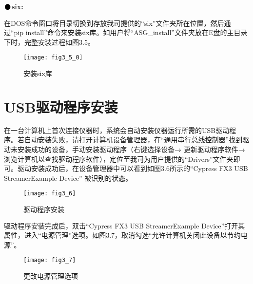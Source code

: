 \newpage
\noindent$\vcenter{\hbox{\huge$\bullet$}}$\quad\fontsize{12pt}{\baselineskip}\textbf{six:}

在DOS命令窗口将目录切换到存放我司提供的“six”文件夹所在位置，然后通过“pip install”命令来安装six库。如用户将“ASG\_install”文件夹放在E盘的主目录下时，完整安装过程如图3.5。
\begin{figure}[H]
\centering
\texttt{[image: fig3\_5\_0]}
\caption{安装six库}
\end{figure}

\section{USB\heiti 驱动程序安装}
在一台计算机上首次连接仪器时，系统会自动安装仪器运行所需的USB驱动程序。若自动安装失败，请打开计算机设备管理器，在“通用串行总线控制器”找到驱动未安装成功的设备，手动安装驱动程序（右键选择设备→ 更新驱动程序软件→浏览计算机以查找驱动程序软件），定位至我司为用户提供的“Drivers”文件夹即可。驱动安装成功后，在设备管理器中可以看到如图3.6所示的“Cypress FX3 USB StreamerExample Device” 被识别的状态。
\begin{figure}[htbp]
\centering
\texttt{[image: fig3\_6]}
\caption{驱动程序安装}
\end{figure}

驱动程序安装完成后，双击“Cypress FX3 USB StreamerExample Device”打开其属性，进入“电源管理”选项。如图3.7，取消勾选“允许计算机关闭此设备以节约电源”。
\begin{figure}[htbp]
\centering
\texttt{[image: fig3\_7]}
\caption{更改电源管理选项}
\end{figure}




